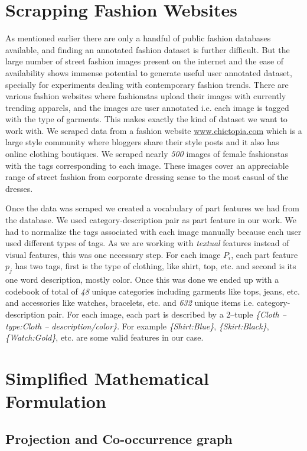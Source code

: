 \section{Scrapping Fashion Websites}
As mentioned earlier there are only a handful of public fashion databases available, and finding an annotated fashion dataset is further difficult. But the large number of street fashion images present on the internet and the ease of availability shows immense potential to generate useful user annotated dataset, specially for experiments dealing with contemporary fashion trends. There are various fashion websites where fashionstas upload their images with currently trending apparels, and the images are user annotated i.e. each image is tagged with the type of garments. This makes exactly the kind of dataset we want to work with. We scraped data from a fashion website \url{www.chictopia.com} which is a large style community where bloggers share their style posts and it also has online clothing boutiques. We scraped nearly \textit{500} images of female fashionstas with the tags corresponding to each image. These images cover an appreciable range of street fashion from corporate dressing sense to the most casual of the dresses.

Once the data was scraped we created a vocabulary of part features we had from the database. We used category-description pair as part feature in our work. We had to normalize the tags associated with each image manually because each user used different types of tags. As we are working with \textit{textual} features instead of visual features, this was one necessary step. For each image $P_i$, each part feature $p_j$ has two tags, first is the type of clothing, like shirt, top, etc. and second is its one word description, mostly color. Once this was done we ended up with a codebook of total of \textit{48} unique categories including garments like tops, jeans, etc. and accessories like watches, bracelets, etc. and \textit{632} unique items i.e. category-description pair. For each image, each part is described by a 2--tuple \textit{\{Cloth -- type:Cloth -- description/color\}}. For example \textit{\{Shirt:Blue\}}, \textit{\{Skirt:Black\}}, \textit{\{Watch:Gold\}}, etc. are some valid features in our case.

\section{Simplified Mathematical Formulation}

\subsection{Projection and Co-occurrence graph}

